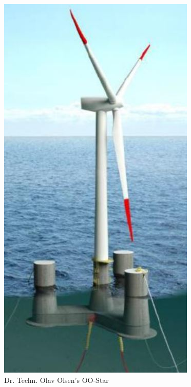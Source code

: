 \begin{figure}[H]
\centering
\includegraphics[scale=0.5]{figures/oostar}
\caption[$\; \:$Dr. Techn. Olav Olsen's OO-Star]{Dr. Techn. Olav Olsen's OO-Star \cite{Lifes50+D4.2} }
 \label{fig:oostarintro}
\end{figure}

